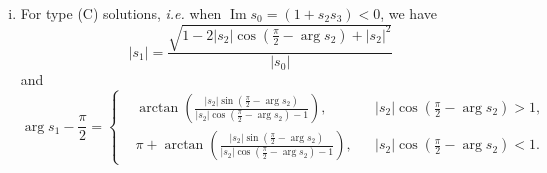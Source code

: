 \documentclass[12pt]{article}
\theoremstyle{plain}
\newtheorem{corollary}{\hskip\parindent Corollary}
\theoremstyle{definition}
\numberwithin{equation}{section}
\renewcommand\Im{\operatorname{Im}}
\begin{document}
\begin{corollary}
\begin{enumerate}[(i)]
\item  For type (C) solutions, {\it i.e.} when $\Im s_{0}=(1+s_{2}s_{3})<0$, we have
\begin{equation}\label{eq-|s1|-by-s2-C}
|s_{1}|=\frac{\sqrt{1-2|s_{2}|\cos(\frac{\pi}{2}-\arg{s_{2}})+|s_{2}|^2}}{|s_{0}|}
\end{equation}
and
\begin{equation}\label{eq-args1-by-s2-C}
\arg{s_{1}}-\frac{\pi}{2}=\left\{\begin{aligned}
&\arctan\left(\frac{|s_{2}|\sin(\frac{\pi}{2}-\arg{s_{2}})}{|s_{2}|\cos(\frac{\pi}{2}-\arg{s_{2}})-1}\right), && |s_{2}|\cos(\frac{\pi}{2}-\arg{s_{2}})>1,\\
&\pi+\arctan\left(\frac{|s_{2}|\sin(\frac{\pi}{2}-\arg{s_{2}})}{|s_{2}|\cos(\frac{\pi}{2}-\arg{s_{2}})-1}\right), && |s_{2}|\cos(\frac{\pi}{2}-\arg{s_{2}})<1.
\end{aligned}\right.
\end{equation}
\end{enumerate}
\end{corollary}
\end{document}
